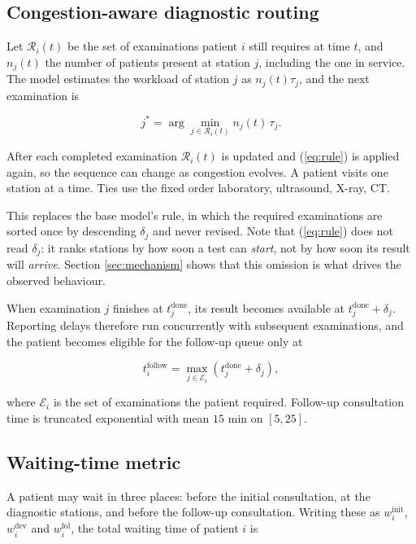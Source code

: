 \documentclass[sigconf]{acmart}
\begin{document}
\subsection{Congestion-aware diagnostic routing}
\label{sec:rule}

Let $\mathcal{R}_i(t)$ be the set of examinations patient $i$ still requires at
time $t$, and $n_j(t)$ the number of patients present at station $j$, including
the one in service. The model estimates the workload of station $j$ as
$n_j(t)\tau_j$, and the next examination is

\begin{equation}
j^{*}=\arg\min_{j\in\mathcal{R}_i(t)} n_j(t)\,\tau_j .
\label{eq:rule}
\end{equation}

After each completed examination $\mathcal{R}_i(t)$ is updated and
(\ref{eq:rule}) is applied again, so the sequence can change as congestion
evolves. A patient visits one station at a time. Ties use the fixed order
laboratory, ultrasound, X-ray, CT.

This replaces the base model's rule, in which the required examinations are
sorted once by descending $\delta_j$ and never revised. Note that
(\ref{eq:rule}) does not read $\delta_j$: it ranks stations by how soon a test
can \emph{start}, not by how soon its result will \emph{arrive}. Section
\ref{sec:mechanism} shows that this omission is what drives the observed
behaviour.

When examination $j$ finishes at $t^{\mathrm{done}}_j$, its result becomes
available at $t^{\mathrm{done}}_j+\delta_j$. Reporting delays therefore run
concurrently with subsequent examinations, and the patient becomes eligible for
the follow-up queue only at

\begin{equation}
t^{\mathrm{follow}}_i=\max_{j\in\mathcal{E}_i}\left(t^{\mathrm{done}}_j+\delta_j\right),
\end{equation}

where $\mathcal{E}_i$ is the set of examinations the patient required.
Follow-up consultation time is truncated exponential with mean $15$ min on
$[5,25]$.

\subsection{Waiting-time metric}
\label{sec:metric}

A patient may wait in three places: before the initial consultation, at the
diagnostic stations, and before the follow-up consultation. Writing these as
$w^{\mathrm{init}}_i$, $w^{\mathrm{dev}}_i$ and $w^{\mathrm{fol}}_i$, the total
waiting time of patient $i$ is
\end{document}
